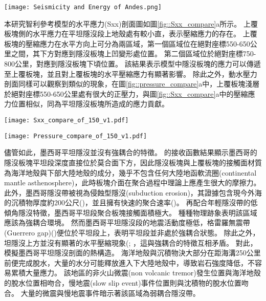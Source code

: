 \begin{figure*}[htp]
    \centering
    \texttt{[image: Seismicity and Energy of Andes.png]}
    \caption[智利沿岸自21$^\circ$S到44$^\circ$S的上板塊地震活動統計分析]{智利沿岸自20$^\circ$S到40$^\circ$S的上板塊地震活動統計分析，摘自\citealp{gutscher2002andean}。這裡採用深度<70公里的地震事件總能量，單位為10$^6$焦耳。右側數字表示1900-1963年/1964-1995年間所示分的第鎮能量。數字下灰色底框標示出平坦隱沒段的位置。
    }
    \label{fig::Chile_seismicity}
\end{figure*}

本研究智利參考模型的水平應力(Sxx)剖面圖如圖\ref{fig::Sxx_compare}a所示。
上覆板塊側的水平應力在平坦隱沒段上地殼處有較小直，表示壓縮應力的存在。
上覆板塊的壓縮應力在水平方向上可分為兩區域，第一個區域位在絕對座標550-650公里之間，其下方對應到隱沒板塊上凹變形處位置。
第二個區域位於絕對座標750-800公里，對應到隱沒板塊下頃位置。
該結果表示模型中隱沒板塊的應力可以傳遞至上覆板塊，並且對上覆板塊的水平壓縮應力有顯著影響。
除此之外，動水壓力剖面同樣可以觀察到類似的現象，在圖\ref{fig::pressure_compare}a中，上覆板塊淺層於絕對座標550-650公里處有很大的正壓力，與圖\ref{fig::Sxx_compare}a中的壓縮應力位置相似，同為平坦隱沒板塊所造成的應力貢獻。

\begin{figure*}[h]
    \centering
    \texttt{[image: Sxx\_compare\_of\_150\_v1.pdf]}
    \caption[參考模型中於30 Myr的水平應力剖面]{參考模型中於30 Myr的水平應力剖面。}
    \label{fig::Sxx_compare}
\end{figure*}

\begin{figure*}[h]
    \centering
    \texttt{[image: Pressure\_compare\_of\_150\_v1.pdf]}
    \caption[參考模型中於30 Myr的動水壓力剖面]{參考模型中於30 Myr的動水壓力剖面。}
    \label{fig::pressure_compare}
\end{figure*}

儘管如此，墨西哥平坦隱沒並沒有強耦合的特徵。
\citealp{PerezCampos2008}的接收函數結果顯示墨西哥的隱沒板塊平坦段深度直接位於莫合面下方，因此隱沒板塊與上覆板塊的接觸面材質為海洋地殼與下部大陸地殼的成分，幾乎不包含任何大陸地函軟流圈(continental mantle asthenosphere)，此時板塊介面在聚合過程中理論上應產生很大的摩擦力。
此外，墨西哥隱沒帶被視為侵蝕型隱沒(subduction erosion)\citealp{stern2011subduction}，其證據包含現今外海的沉積物厚度約200公尺(\citealp{manea2003sediment})，並且擁有快速的聚合速率(\citealp{o2005uncertainties})。
再配合年輕隱沒帶的低傾角隱沒特徵，墨西哥平坦段聚合板塊接觸面積極大。
種種物理跡象表明該區域應該為強耦合環境。
然而墨西哥平坦隱沒段的地震活動度極低，格雷羅無震帶(Guerrero gap)(\citealp{kostoglodov2003large})便位於平坦段上，表明平坦段並非處於強耦合狀態。
除此之外，坦隱沒上方並沒有顯著的水平壓縮現象(\citealp{nieto2006latest}; \citealp{moran2007cenozoic}，這與強耦合的特徵互相矛盾。
對此，\citealp{Manea2011Thermal}模擬墨西哥平坦隱沒剖面的熱構造。
海洋地殼與沉積物決大部分在距海溝250公里前便完成脫水，大量的水分可能釋放進入下大陸地殼中，導致岩石強度降低，不容易累積大量應力。
該地區的非火山微震(non volcanic tremor)發生位置與海洋地殼的脫水位置相吻合\citealp{Manea2011Thermal}，慢地震(slow slip event)事件位置則與沈積物的脫水位置吻合\citealp{Song2009}。
大量的微震與慢地震事件暗示著該區域為弱耦合隱沒帶。

